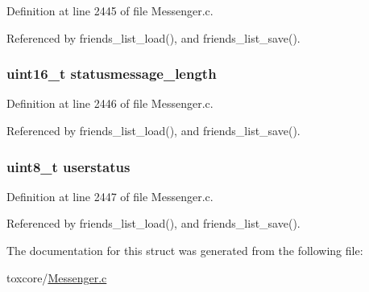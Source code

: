 Definition at line 2445 of file Messenger.\+c.



Referenced by friends\+\_\+list\+\_\+load(), and friends\+\_\+list\+\_\+save().

\hypertarget{struct_s_a_v_e_d___f_r_i_e_n_d_a43fe9dde52dc12e90933150eca91c0c3}{
\subsubsection[{statusmessage\+\_\+length}]{\setlength{\rightskip}{0pt plus 5cm}uint16\+\_\+t statusmessage\+\_\+length}}\label{struct_s_a_v_e_d___f_r_i_e_n_d_a43fe9dde52dc12e90933150eca91c0c3}


Definition at line 2446 of file Messenger.\+c.



Referenced by friends\+\_\+list\+\_\+load(), and friends\+\_\+list\+\_\+save().

\hypertarget{struct_s_a_v_e_d___f_r_i_e_n_d_a6985227ceff68d0298d6ee9e09316945}{
\subsubsection[{userstatus}]{\setlength{\rightskip}{0pt plus 5cm}uint8\+\_\+t userstatus}}\label{struct_s_a_v_e_d___f_r_i_e_n_d_a6985227ceff68d0298d6ee9e09316945}


Definition at line 2447 of file Messenger.\+c.



Referenced by friends\+\_\+list\+\_\+load(), and friends\+\_\+list\+\_\+save().



The documentation for this struct was generated from the following file\+:\begin{DoxyCompactItemize}
\item 
toxcore/\hyperlink{_messenger_8c}{Messenger.\+c}\end{DoxyCompactItemize}
